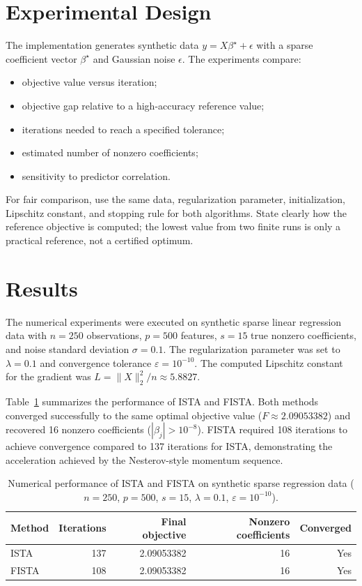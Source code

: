 \documentclass[11pt]{article}
\begin{document}
\section{Experimental Design}
The implementation generates synthetic data $y=X\beta^\star+\epsilon$ with a
sparse coefficient vector $\beta^\star$ and Gaussian noise $\epsilon$. The
experiments compare:
\begin{itemize}
  \item objective value versus iteration;
  \item objective gap relative to a high-accuracy reference value;
  \item iterations needed to reach a specified tolerance;
  \item estimated number of nonzero coefficients;
  \item sensitivity to predictor correlation.
\end{itemize}
For fair comparison, use the same data, regularization parameter, initialization,
Lipschitz constant, and stopping rule for both algorithms. State clearly how
the reference objective is computed; the lowest value from two finite runs is
only a practical reference, not a certified optimum.

\section{Results}
The numerical experiments were executed on synthetic sparse linear regression data
with $n=250$ observations, $p=500$ features, $s=15$ true nonzero coefficients, and noise
standard deviation $\sigma=0.1$. The regularization parameter was set to $\lambda=0.1$
and convergence tolerance $\varepsilon=10^{-10}$. The computed Lipschitz constant for
the gradient was $L = \|X\|_2^2 / n \approx 5.8827$.

Table~\ref{tab:results} summarizes the performance of ISTA and FISTA. Both methods converged
successfully to the same optimal objective value ($F \approx 2.09053382$) and recovered
16 nonzero coefficients ($|\beta_j| > 10^{-8}$). FISTA required 108 iterations to achieve
convergence compared to 137 iterations for ISTA, demonstrating the acceleration achieved
by the Nesterov-style momentum sequence.

\begin{table}[H]
\centering
\begin{tabular}{lrrrr}
\toprule
Method & Iterations & Final objective & Nonzero coefficients & Converged\\
\midrule
ISTA  & 137 & 2.09053382 & 16 & Yes \\
FISTA & 108 & 2.09053382 & 16 & Yes \\
\bottomrule
\end{tabular}
\caption{Numerical performance of ISTA and FISTA on synthetic sparse regression data ($n=250$, $p=500$, $s=15$, $\lambda=0.1$, $\varepsilon=10^{-10}$).}
\label{tab:results}
\end{table}
\end{document}
